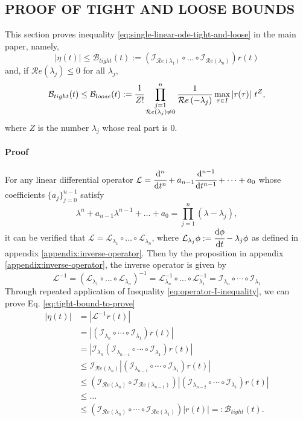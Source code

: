 \documentclass[]{uai2023}
\newcommand{\dt}[1]{\cfrac{\mathrm{d} #1}{\mathrm{d} t}}
\newcommand{\dnt}[2]{\cfrac{\mathrm{d}^{#1} #2}{\mathrm{d} t^{#1}}}
\newcommand{\Err}{\eta}
\newcommand{\Bound}{\mathcal{B}}
\renewcommand{\L}{\mathcal{L}}
\newcommand{\I}{\mathcal{I}}
\renewcommand{\Re}[1]{\mathcal{R}e\left(#1\right)}
\begin{document}
\subsection{PROOF OF TIGHT AND LOOSE BOUNDS}
This section proves inequality \ref{eq:single-linear-ode-tight-and-loose} in the main paper, namely,
\begin{equation}\label{eq:tight-bound-to-prove}
    |\Err(t)| \leq \Bound_{tight}(t) :=\left(\I_{\Re{\lambda_1}}\circ\dots\circ\I_{\Re{\lambda_n}}\right)r(t)
\end{equation}
and, if $\Re{\lambda_j} \leq 0$ for all $\lambda_j$, 
\begin{equation}\label{eq:loose-bound-to-prove}
    \Bound_{tight}(t) \leq \Bound_{loose}(t) := \cfrac{1}{Z!} \prod_{\substack{j=1\\ \Re{\lambda_j} \neq 0}}^n \frac{1}{\Re{-\lambda_j}} \max_{\tau\in I}\left|r(\tau)\right|\, t^{Z},
\end{equation}
where $Z$ is the number $\lambda_j$ whose real part is $0$.

\paragraph{Proof} For any linear differential operator $\L=\dnt{n}{} + a_{n-1}\dnt{n-1}{}+\dots+a_0$ whose coefficients $\{a_j\}_{j=0}^{n-1}$ satisfy 
\[
    \lambda^n + a_{n-1}\lambda^{n-1} + \dots +a_0 = \prod_{j=1}^{n} \left(\lambda - \lambda_j\right),
\]
it can be verified that $\L = \L_{\lambda_1} \circ\dots \circ \L_{\lambda_n}$, where $\L_{\lambda_j}\phi := \dt{\phi}-\lambda_j\phi$ as defined in appendix \ref{appendix:inverse-operator}. Then by the proposition in appendix \ref{appendix:inverse-operator}, the inverse operator is given by
\begin{equation}
    \L^{-1} = \left(\L_{\lambda_1} \circ\dots \circ \L_{\lambda_n}\right)^{-1} = \L_{\lambda_n}^{-1} \circ\dots \circ \L_{\lambda_1}^{-1} = \I_{\lambda_n} \circ\cdots\circ\I_{\lambda_1}
\end{equation}
Through repeated application of Inequality \ref{eq:operator-I-inequality}, we can prove Eq. \ref{eq:tight-bound-to-prove}
\begin{align}
    \left|\Err(t)\right| &= \left| \L^{-1} r(t) \right| \\
    &=\left|\left(\I_{\lambda_n} \circ\cdots\circ\I_{\lambda_1}\right) r(t)\right| \\
    &=\left|\I_{\lambda_n}\left(\I_{\lambda_{n-1}} \circ\cdots\circ\I_{\lambda_1}\right) r(t)\right| \\
    &\leq \I_{\Re{\lambda_n}}\left|\left(\I_{\lambda_{n-1}} \circ\cdots\circ\I_{\lambda_1}\right) r(t)\right| \\
    &\leq \left(\I_{\Re{\lambda_n}}\circ \I_{\Re{\lambda_{n-1}}}\right)\left|\left(\I_{\lambda_{n-2}} \circ\cdots\circ\I_{\lambda_1}\right) r(t)\right| \\
    &\leq \dots \nonumber \\
    &\leq \left(\I_{\Re{\lambda_n}}\circ \cdots \circ\I_{\Re{\lambda_{1}}}\right)\left|r(t)\right| =: \Bound_{tight}(t).
\end{align}
\end{document}
